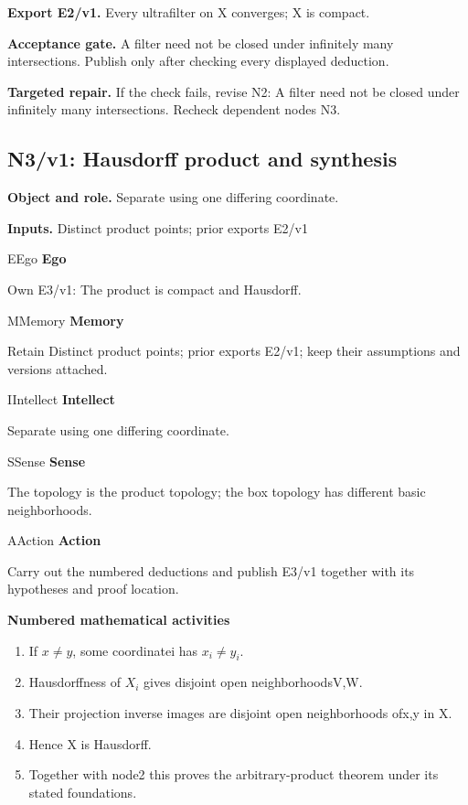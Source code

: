 \documentclass[preprint,12pt,aps,pra,showkeys,amsmath,amssymb,superscriptaddress,floatfix]{revtex4-2}
\theoremstyle{definition}
\theoremstyle{remark}
\newcommand{\mmfaculty}[3]{%
 \begin{mmfacultybox}{#1}{#2}
 {\sffamily\bfseries\color{MMBlue}#2}\par\smallskip #3
 \end{mmfacultybox}}
\newcommand{\field}[2]{\par\smallskip\noindent\textbf{#1.} #2\par}
\begin{document}
\field{Export E2/v1}{Every ultrafilter on X converges; X is compact.}

\field{Acceptance gate}{A filter need not be closed under infinitely many intersections. Publish
only after checking every displayed deduction.}

\field{Targeted repair}{If the check fails, revise N2: A filter need not be closed under
infinitely many intersections. Recheck dependent nodes N3.}

\clearpage

\subsection{N3/v1: Hausdorff product and synthesis}

\field{Object and role}{Separate using one differing coordinate.}

\field{Inputs}{Distinct product points; prior exports E2/v1}

\mmfaculty{E}{Ego}{Own E3/v1: The product is compact and Hausdorff.}

\mmfaculty{M}{Memory}{Retain Distinct product points; prior exports E2/v1; keep their
assumptions and versions attached.}

\mmfaculty{I}{Intellect}{Separate using one differing coordinate.}

\mmfaculty{S}{Sense}{The topology is the product topology; the box topology has different
basic neighborhoods.}

\mmfaculty{A}{Action}{Carry out the numbered deductions and publish E3/v1 together with its
hypotheses and proof location.}

\smallskip\noindent\textbf{Numbered mathematical activities}

\begin{enumerate}[label=N3.\arabic*,leftmargin=3.4em]

\item If \(x\ne y\), some coordinatei has \(x_i\ne y_i\).

\item Hausdorffness of \(X_i\) gives disjoint open neighborhoodsV,W.

\item Their projection inverse images are disjoint open neighborhoods ofx,y in
X.

\item Hence X is Hausdorff.

\item Together with node2 this proves the arbitrary-product theorem under its
stated foundations.

\end{enumerate}
\end{document}
